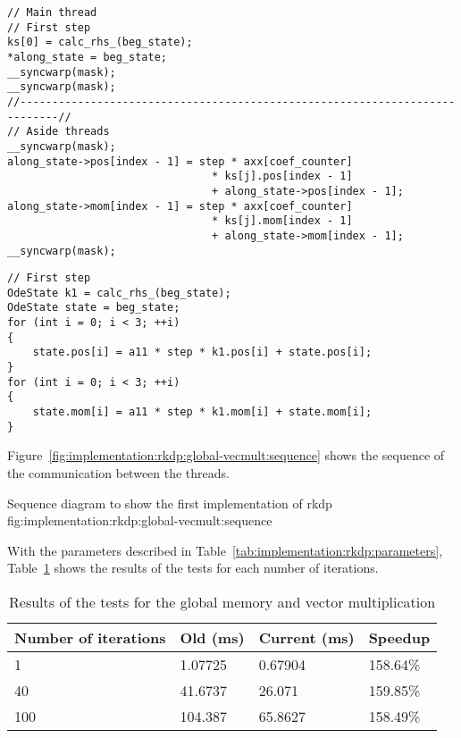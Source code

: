 \begin{code}
    \label{code:implementation:rkdp:global-vecmult:syncwarp}
    \begin{verbatim}
// Main thread
// First step
ks[0] = calc_rhs_(beg_state);
*along_state = beg_state;
__syncwarp(mask);
__syncwarp(mask);
//----------------------------------------------------------------------------//
// Aside threads
__syncwarp(mask);
along_state->pos[index - 1] = step * axx[coef_counter]
                                * ks[j].pos[index - 1]
                                + along_state->pos[index - 1];
along_state->mom[index - 1] = step * axx[coef_counter]
                                * ks[j].mom[index - 1]
                                + along_state->mom[index - 1];
__syncwarp(mask);
    \end{verbatim}
\end{code}

\begin{code}
    \label{code:implementation:rkdp:global-vecmult:legacy}
    \begin{verbatim}
// First step
OdeState k1 = calc_rhs_(beg_state);
OdeState state = beg_state;
for (int i = 0; i < 3; ++i)
{
    state.pos[i] = a11 * step * k1.pos[i] + state.pos[i];
}
for (int i = 0; i < 3; ++i)
{
    state.mom[i] = a11 * step * k1.mom[i] + state.mom[i];
}
    \end{verbatim}
\end{code}

Figure~\ref{fig:implementation:rkdp:global-vecmult:sequence} shows the sequence
of the communication between the threads.

{Sequence diagram to show the first implementation of \acrshort{rkdp}}
{fig:implementation:rkdp:global-vecmult:sequence}

With the parameters described in Table~\ref{tab:implementation:rkdp:parameters},
Table~\ref{tab:implementation:rkdp:global-vecmult:results} shows the results
of the tests for each number of iterations.

\begin{table}[ht]
    \centering
    \begin{tabular}{|l|l|l|l|}
        \hline
        \textbf{Number of iterations} & \textbf{Old (ms)} & \textbf{Current (ms)} & \textbf{Speedup} \\
        \hline
        1 & 1.07725 & 0.67904 & 158.64\% \\
        \hline
        40 & 41.6737 & 26.071 & 159.85\% \\
        \hline
        100 & 104.387 & 65.8627 & 158.49\% \\
        \hline
    \end{tabular}
    \caption{Results of the tests for the global memory and vector multiplication}
    \label{tab:implementation:rkdp:global-vecmult:results}
\end{table}

